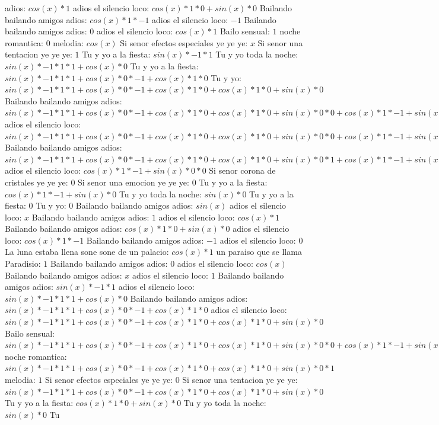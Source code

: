 \documentclass{article}
\begin{document}
adios: $cos(x)*1$ adios el silencio loco: $cos(x)*1*0+sin(x)*0$ Bailando bailando amigos adios: $cos(x)*1*-1$ adios el silencio loco: $-1$ Bailando bailando amigos adios: $0$  \newline adios el silencio loco: $cos(x)*1$ Bailo sensual: $1$ noche romantica: $0$  \newline melodia: $cos(x)$  \newline Si senor efectos especiales ye ye ye: $x$ Si senor una tentacion ye ye ye: $1$  \newline Tu y yo a la fiesta: $sin(x)*-1*1$ Tu y yo toda la noche: $sin(x)*-1*1*1+cos(x)*0$ Tu y yo a la fiesta: ${sin(x)*-1*1*1+cos(x)*0}*-1+cos(x)*1*0$ Tu y yo: ${sin(x)*-1*1*1+cos(x)*0}*-1+cos(x)*1*0+cos(x)*1*0+sin(x)*0$ Bailando bailando amigos adios: ${{sin(x)*-1*1*1+cos(x)*0}*-1+cos(x)*1*0+cos(x)*1*0+sin(x)*0}*0+{cos(x)*1*-1+sin(x)*0}*0$ adios el silencio loco: ${{sin(x)*-1*1*1+cos(x)*0}*-1+cos(x)*1*0+cos(x)*1*0+sin(x)*0}*0+{cos(x)*1*-1+sin(x)*0}*0+{cos(x)*1*-1+sin(x)*0}*0+sin(x)*-1*0$ Bailando bailando amigos adios: ${{sin(x)*-1*1*1+cos(x)*0}*-1+cos(x)*1*0+cos(x)*1*0+sin(x)*0}*1+{cos(x)*1*-1+sin(x)*0}*0$  \newline adios el silencio loco: ${cos(x)*1*-1+sin(x)*0}*0$ Si senor corona de cristales ye ye ye: $0$ Si senor una emocion ye ye ye: $0$  \newline Tu y yo a la fiesta: $cos(x)*1*-1+sin(x)*0$  \newline Tu y yo toda la noche: $sin(x)*0$ Tu y yo a la fiesta: $0$ Tu y yo: $0$  \newline Bailando bailando amigos adios: $sin(x)$  \newline adios el silencio loco: $x$ Bailando bailando amigos adios: $1$  \newline adios el silencio loco: $cos(x)*1$ Bailando bailando amigos adios: $cos(x)*1*0+sin(x)*0$ adios el silencio loco: $cos(x)*1*-1$ Bailando bailando amigos adios: $-1$ adios el silencio loco: $0$  \newline La luna estaba llena sone sone de un palacio: $cos(x)*1$ un paraiso que se llama Paradisio: $1$ Bailando bailando amigos adios: $0$  \newline adios el silencio loco: $cos(x)$  \newline Bailando bailando amigos adios: $x$ adios el silencio loco: $1$  \newline Bailando bailando amigos adios: $sin(x)*-1*1$ adios el silencio loco: $sin(x)*-1*1*1+cos(x)*0$ Bailando bailando amigos adios: ${sin(x)*-1*1*1+cos(x)*0}*-1+cos(x)*1*0$ adios el silencio loco: ${sin(x)*-1*1*1+cos(x)*0}*-1+cos(x)*1*0+cos(x)*1*0+sin(x)*0$ Bailo sensual: ${{sin(x)*-1*1*1+cos(x)*0}*-1+cos(x)*1*0+cos(x)*1*0+sin(x)*0}*0+{cos(x)*1*-1+sin(x)*0}*0$ noche romantica: ${{sin(x)*-1*1*1+cos(x)*0}*-1+cos(x)*1*0+cos(x)*1*0+sin(x)*0}*1$ melodia: $1$ Si senor efectos especiales ye ye ye: $0$  \newline Si senor una tentacion ye ye ye: ${sin(x)*-1*1*1+cos(x)*0}*-1+cos(x)*1*0+cos(x)*1*0+sin(x)*0$  \newline Tu y yo a la fiesta: $cos(x)*1*0+sin(x)*0$  \newline Tu y yo toda la noche: $sin(x)*0$ Tu 
\end{document}
